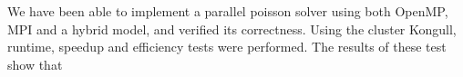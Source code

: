 We have been able to implement a parallel poisson solver using both OpenMP, MPI and a hybrid model, and verified its correctness. Using the cluster Kongull, runtime, speedup and efficiency tests were performed. The results of these test show that